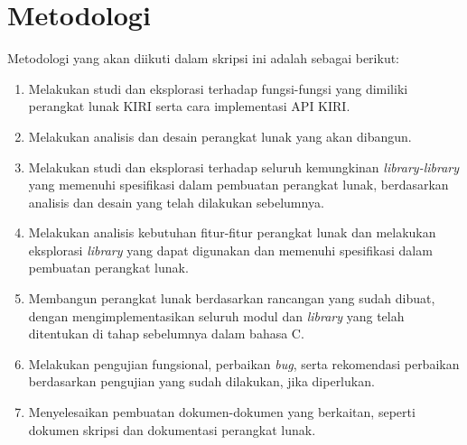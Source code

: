 \section{Metodologi}
\label{sec:metlit}
Metodologi yang akan diikuti dalam skripsi ini adalah sebagai berikut:
	\begin{enumerate}
		\item Melakukan studi dan eksplorasi terhadap fungsi-fungsi yang dimiliki perangkat lunak KIRI serta cara implementasi API KIRI.
		\item Melakukan analisis dan desain perangkat lunak yang akan dibangun.
	    \item Melakukan studi dan eksplorasi terhadap seluruh kemungkinan \textit{library-library} yang memenuhi spesifikasi dalam pembuatan perangkat lunak, berdasarkan analisis dan desain yang telah dilakukan sebelumnya.
		\item Melakukan analisis kebutuhan fitur-fitur perangkat lunak dan melakukan eksplorasi \textit{library} yang dapat digunakan dan memenuhi spesifikasi dalam pembuatan perangkat lunak.
		\item Membangun perangkat lunak berdasarkan rancangan yang sudah dibuat, dengan mengimplementasikan seluruh modul dan \textit{library} yang telah ditentukan di tahap sebelumnya dalam bahasa C.
		\item Melakukan pengujian fungsional, perbaikan \textit{bug}, serta rekomendasi perbaikan berdasarkan pengujian yang sudah dilakukan, jika diperlukan.
		\item Menyelesaikan pembuatan dokumen-dokumen yang berkaitan, seperti dokumen skripsi dan dokumentasi perangkat lunak.
	\end{enumerate}

